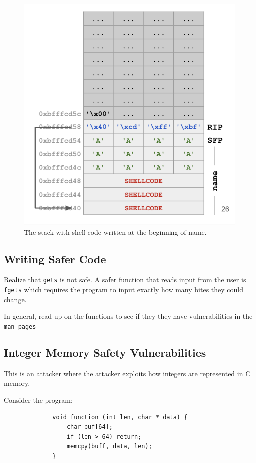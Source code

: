 \documentclass{article}
\begin{document}
\begin{figure}[h]
    \centering
    \includegraphics[scale=1.0]{images/writing-shellcode.png}
    \caption{The stack with shell code written at the beginning of name.}
\end{figure}


\subsection*{Writing Safer Code}
Realize that \lstinline{gets} is not safe. A safer function that reads input from the user is \lstinline{fgets} which requires the program to input exactly how many bites they could change.

In general, read up on the functions to see if they they have vulnerabilities in the \lstinline{man pages}


\subsection*{Integer Memory Safety Vulnerabilities}
This is an attacker where the attacker exploits how integers are represented in C memory.

Consider the program:
\begin{figure}[H]
    \begin{lstlisting}
        void function (int len, char * data) {
            char buf[64];
            if (len > 64) return;
            memcpy(buff, data, len);
        }
    \end{lstlisting}
\end{figure}
\end{document}
